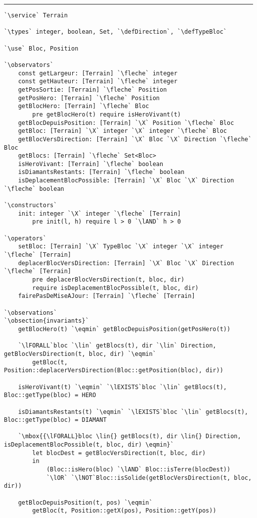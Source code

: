 \documentclass{article}
\newcommand{\fleche}{$\rightarrow{}$}
\newcommand{\X}{$\times{}$}
\newcommand{\eqmin}{$\overset{min}{=}$}
\newcommand{\lAND}{$\land$}
\newcommand{\lOR}{$\lor$}
\newcommand{\lNOT}{$\lnot$}
\newcommand{\lFORALL}{$\forall$}
\newcommand{\lEXISTS}{$\exists$}
\newcommand{\lin}{$\in$}
\newcommand{\specsec}[1]{\Large{\textbf{#1:}}}
\newcommand{\service}{\specsec {Service}}
\newcommand{\types}{\specsec {Types}}
\newcommand{\use}{\specsec {Use}}
\newcommand{\observators}{\specsec {Observators}}
\newcommand{\constructors}{\specsec {Constructors}}
\newcommand{\operators}{\specsec {Operators}}
\newcommand{\observations}{\specsec {Observations}}
\newcommand{\obsection}[1]{\textbf{[#1]}}
\newcommand{\TypeBloc}{TypeBloc}
\newcommand{\defTypeBloc}{\mbox{enum \TypeBloc}~\{~VIDE, TERRE, MUR, HERO, SORTIE\_FERMEE, SORTIE\_OUVERTE, ROCHER, DIAMANT~\}}
\newcommand{\Direction}{Direction}
\newcommand{\defDirection}{\mbox{enum \Direction}~\{~HAUT, BAS, GAUCHE, DROITE~\}}
\begin{document}
\hrule
\clearpage{}

\begin{lstlisting}[caption=Service Terrain]
`\service` Terrain

`\types` integer, boolean, Set, `\defDirection`, `\defTypeBloc`

`\use` Bloc, Position

`\observators`
	const getLargeur: [Terrain] `\fleche` integer
	const getHauteur: [Terrain] `\fleche` integer
	getPosSortie: [Terrain] `\fleche` Position
	getPosHero: [Terrain] `\fleche` Position
	getBlocHero: [Terrain] `\fleche` Bloc
		pre getBlocHero(t) require isHeroVivant(t)
	getBlocDepuisPosition: [Terrain] `\X` Position `\fleche` Bloc
	getBloc: [Terrain] `\X` integer `\X` integer `\fleche` Bloc
	getBlocVersDirection: [Terrain] `\X` Bloc `\X` Direction `\fleche` Bloc
	getBlocs: [Terrain] `\fleche` Set<Bloc>
	isHeroVivant: [Terrain] `\fleche` boolean
	isDiamantsRestants: [Terrain] `\fleche` boolean
	isDeplacementBlocPossible: [Terrain] `\X` Bloc `\X` Direction `\fleche` boolean
	
`\constructors`
	init: integer `\X` integer `\fleche` [Terrain]
		pre init(l, h) require l > 0 `\lAND` h > 0
	
`\operators`
	setBloc: [Terrain] `\X` TypeBloc `\X` integer `\X` integer `\fleche` [Terrain]
	deplacerBlocVersDirection: [Terrain] `\X` Bloc `\X` Direction `\fleche` [Terrain]
		pre deplacerBlocVersDirection(t, bloc, dir)
		require isDeplacementBlocPossible(t, bloc, dir)
	fairePasDeMiseAJour: [Terrain] `\fleche` [Terrain]
	
`\observations`
`\obsection{invariants}`
	getBlocHero(t) `\eqmin` getBlocDepuisPosition(getPosHero(t))
	
	`\lFORALL`bloc `\lin` getBlocs(t), dir `\lin` Direction, getBlocVersDirection(t, bloc, dir) `\eqmin`
		getBloc(t, Position::deplacerVersDirection(Bloc::getPosition(bloc), dir))
		
	isHeroVivant(t) `\eqmin` `\lEXISTS`bloc `\lin` getBlocs(t), Bloc::getType(bloc) = HERO
	
	isDiamantsRestants(t) `\eqmin` `\lEXISTS`bloc `\lin` getBlocs(t), Bloc::getType(bloc) = DIAMANT
	
	`\mbox{{\lFORALL}bloc \lin{} getBlocs(t), dir \lin{} Direction, isDeplacementBlocPossible(t, bloc, dir) \eqmin}`
		let blocDest = getBlocVersDirection(t, bloc, dir)
		in
			(Bloc::isHero(bloc) `\lAND` Bloc::isTerre(blocDest))
			`\lOR` `\lNOT`Bloc::isSolide(getBlocVersDirection(t, bloc, dir))
	
	getBlocDepuisPosition(t, pos) `\eqmin`
		getBloc(t, Position::getX(pos), Position::getY(pos))
	

\end{lstlisting}
\end{document}
